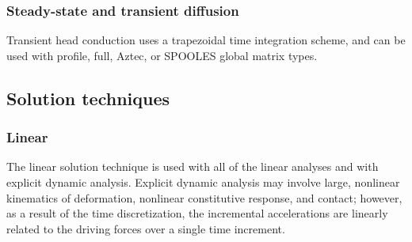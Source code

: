 \subsubsection{Steady-state and transient diffusion}
Transient head conduction uses a trapezoidal time integration scheme, and
can be used with profile, full, \textsf{Aztec}, or 
\textsf{SPOOLES}  global
matrix types.

\subsection{Solution techniques}

\subsubsection{Linear}
The linear solution technique is used with all of the linear analyses and
with explicit dynamic analysis.  Explicit dynamic analysis may involve
large, nonlinear kinematics of deformation, nonlinear constitutive
response, and contact; however, as a result of the time discretization, the
incremental accelerations are linearly related to the driving forces over a
single time increment.

